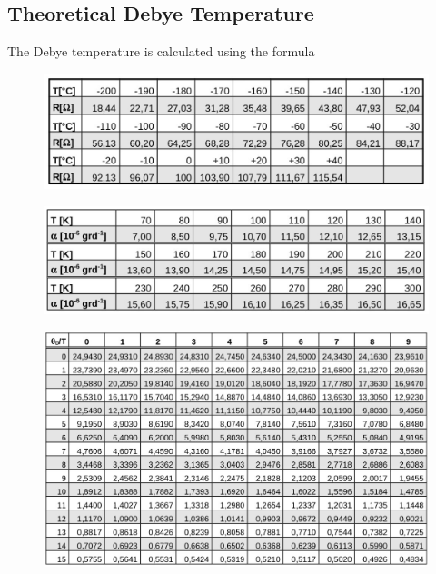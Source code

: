 \subsection{Theoretical Debye Temperature}
\label{sec:theoretical_debye_temperature}

The Debye temperature is calculated using the formula %

\begin{figure}[H]
	\centering
	\includegraphics[width=0.6\linewidth]{content/graphics/resistance.jpg}
	\caption{\cite{molar_heat}}
	\label{fig:resistance}
\end{figure}

\begin{figure}[H]
	\centering
	\includegraphics[width=0.6\linewidth]{content/graphics/expansion.jpg}
	\caption{\cite{molar_heat}}
	\label{fig:expansion}
\end{figure}

\begin{figure}[H]
	\centering
	\includegraphics[width=0.8\linewidth]{content/graphics/ratio.jpg}
	\caption{\cite{molar_heat}}
	\label{fig:ratio}
\end{figure}
